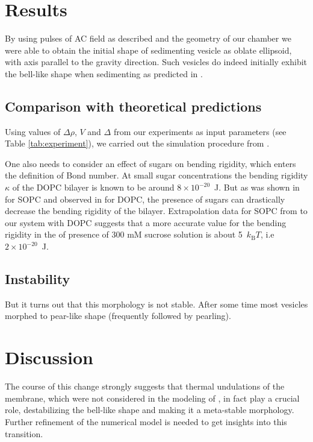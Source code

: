 \documentclass[10pt,a4paper]{article}
\begin{document}
\section{Results}\label{results}
By using pulses of AC field as described and the geometry of our chamber we were able to obtain the initial shape of sedimenting vesicle as oblate ellipsoid, with axis parallel to the gravity direction.
Such vesicles do indeed initially exhibit the bell-like shape when sedimenting as predicted in \cite{Boedec2012}.



\subsection{Comparison with theoretical predictions}
Using values of $\Delta\rho$, $V$ and $\Delta$ from our experiments as input parameters (see Table \ref{tab:experiment}), we carried out the simulation procedure from \cite{Boedec2012}.

One also needs to consider an effect of sugars on bending rigidity, which enters the definition of Bond number.
At small sugar concentrations the bending rigidity $\kappa$ of the DOPC bilayer is known to be around $8\times10^{-20}$~J.
But as was shown in \cite{Vitkova2006} for SOPC and observed in \cite{Shchelokovskyy2011} for DOPC, the presence of sugars can drastically decrease the bending rigidity of the bilayer. 
Extrapolation data for SOPC from \cite{Vitkova2006} to our system with DOPC suggests that a more accurate value for the bending rigidity in the of presence of 300 mM sucrose solution is about 5~$k_\mathrm{B}T$, i.e $2\times10^{-20}$~J.

\subsection{Instability}
But it turns out that this morphology is not stable. After some time most vesicles morphed to pear-like shape (frequently followed by pearling).

\section{Discussion}\label{discussion}
The course of this change strongly suggests that thermal undulations of the membrane, which were not considered in the modeling of \cite{Boedec2012}, in fact play a crucial role, destabilizing the bell-like shape and making it a meta-stable morphology. Further refinement of the numerical model is needed to get insights into this transition.


\end{document}
